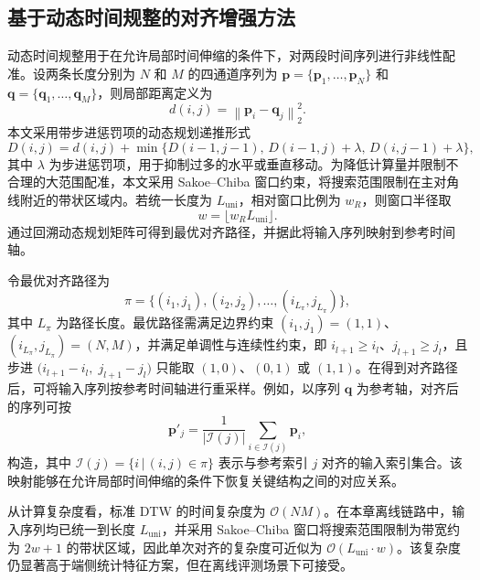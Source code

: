 \subsection{基于动态时间规整的对齐增强方法}
\label{subsec:ch3_dtw_def}

动态时间规整用于在允许局部时间伸缩的条件下，对两段时间序列进行非线性配准\cite{ch3_sakoe1978dtw}。设两条长度分别为 $N$ 和 $M$ 的四通道序列为 $\mathbf{p}=\{\mathbf{p}_1,\ldots,\mathbf{p}_N\}$ 和 $\mathbf{q}=\{\mathbf{q}_1,\ldots,\mathbf{q}_M\}$，则局部距离定义为
\begin{equation}
    d(i,j)=\left\|\mathbf{p}_i-\mathbf{q}_j\right\|_2^2.
\end{equation}
本文采用带步进惩罚项的动态规划递推形式
\begin{equation}
    D(i,j)=d(i,j)+\min\big\{D(i-1,j-1),\,D(i-1,j)+\lambda,\,D(i,j-1)+\lambda\big\},
\end{equation}
其中 $\lambda$ 为步进惩罚项，用于抑制过多的水平或垂直移动。为降低计算量并限制不合理的大范围配准，本文采用 Sakoe--Chiba 窗口约束，将搜索范围限制在主对角线附近的带状区域内。若统一长度为 $L_{\mathrm{uni}}$，相对窗口比例为 $w_R$，则窗口半径取
\begin{equation}
    w=\lfloor w_R L_{\mathrm{uni}} \rfloor.
\end{equation}
通过回溯动态规划矩阵可得到最优对齐路径，并据此将输入序列映射到参考时间轴。

令最优对齐路径为
\begin{equation}
    \pi=\{(i_1,j_1),(i_2,j_2),\ldots,(i_{L_\pi},j_{L_\pi})\},
\end{equation}
其中 $L_\pi$ 为路径长度。最优路径需满足边界约束 $(i_1,j_1)=(1,1)$、$(i_{L_\pi},j_{L_\pi})=(N,M)$，并满足单调性与连续性约束，即 $i_{l+1}\ge i_l$、$j_{l+1}\ge j_l$，且步进 $\big(i_{l+1}-i_l,\;j_{l+1}-j_l\big)$ 只能取 $(1,0)$、$(0,1)$ 或 $(1,1)$。在得到对齐路径后，可将输入序列按参考时间轴进行重采样。例如，以序列 $\mathbf{q}$ 为参考轴，对齐后的序列可按
\begin{equation}
    \mathbf{p}'_{j}=\frac{1}{|\mathcal{I}(j)|}\sum_{i\in\mathcal{I}(j)}\mathbf{p}_{i},
\end{equation}
构造，其中 $\mathcal{I}(j)=\{i\,|\,(i,j)\in\pi\}$ 表示与参考索引 $j$ 对齐的输入索引集合。该映射能够在允许局部时间伸缩的条件下恢复关键结构之间的对应关系。

从计算复杂度看，标准 DTW 的时间复杂度为 $\mathcal{O}(NM)$。在本章离线链路中，输入序列均已统一到长度 $L_{\mathrm{uni}}$，并采用 Sakoe--Chiba 窗口将搜索范围限制为带宽约为 $2w+1$ 的带状区域，因此单次对齐的复杂度可近似为 $\mathcal{O}(L_{\mathrm{uni}}\cdot w)$。该复杂度仍显著高于端侧统计特征方案，但在离线评测场景下可接受。

